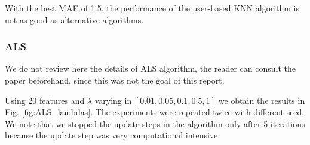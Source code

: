 \begin{figure}[h]
\begin{minipage}{\textwidth}
    \label{fig:KNN_kvalues}
  \end{minipage}
\end{figure}

With the best MAE of 1.5, the performance of the user-based KNN algorithm is not as good as alternative algorithms. 

\subsubsection{ALS}
We do not review here the details of ALS algorithm, the reader can consult the paper \cite{Zhou:2008} beforehand, since this was not the goal of this report.

Using 20 features and $\lambda$ varying in $[0.01,0.05,0.1,0.5,1]$ we obtain the results in Fig. \ref{fig:ALS_lambdas}. The experiments were repeated twice with different seed. We note that we stopped the update steps in the algorithm only after 5 iterations because the update step was very computational intensive.

